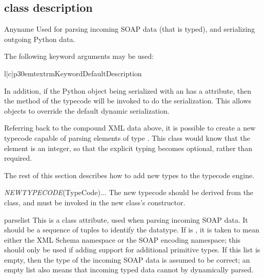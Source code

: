 \subsection{class description}
\begin{classdesc}{Any}{name}
Used for parsing incoming SOAP data (that is typed), and serializing
outgoing Python data.

The following keyword arguments may be used:

\begin{tableiii}{l|c|p{30em}}{textrm}{Keyword}{Default}{Description}
\end{tableiii}

In addition, if the Python object being serialized with an 
has a  attribute, then the  method of
the typecode will be invoked to do the serialization.
This allows objects to override the default dynamic serialization.
\end{classdesc}

Referring back to the compound XML data above, it is possible to create a new
typecode capable of parsing elements of type .
This class would know that the  element is an integer,
so that the explicit typing becomes optional, rather than required.

The rest of this section describes how to add new
types to the \ZSI{} typecode engine.

\begin{classdesc}{\emph{NEWTYPECODE}(TypeCode)}{...}
The new typecode should be derived from the  class, and
 must be invoked in the new class's constructor.
\end{classdesc}

\begin{memberdesc}{parselist}
This is a class attribute, used when parsing incoming SOAP data.
It should be a sequence of  tuples to identify
the datatype.
If  is , it is taken to mean either the XML Schema
namespace or the SOAP encoding namespace;
this should only be used if adding support for additional primitive types.
If this list is empty, then the type of the incoming SOAP data is assumed
to be correct; an empty list also means that incoming typed data cannot
by dynamically parsed.
\end{memberdesc}

